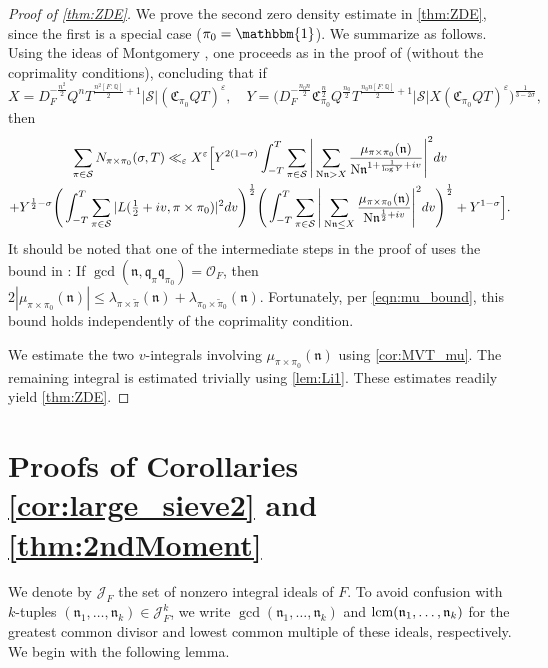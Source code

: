 \documentclass[11pt]{amsart}
\theoremstyle{remark}
\numberwithin{equation}{section}
\newcommand{\kn}{\mathfrak{n}}
\newcommand{\kq}{\mathfrak{q}}
\newcommand{\N}{\textnormal{N}}
\newcommand{\Q}{\mathbb{Q}}
\newcommand{\mJ}{\mathcal{J}}
\renewcommand{\tilde}{\widetilde}
\newcommand{\lcm}{\textnormal{lcm}}
\renewcommand{\epsilon}{\varepsilon}
\begin{document}
\begin{proof}[Proof of \cref{thm:ZDE}]
We prove the second zero density estimate in \cref{thm:ZDE}, since the first is a special case ($\pi_0=\mathbbm{1}$).  We summarize as follows.  Using the ideas of Montgomery \cite{Monty}, one proceeds as in the proof of \cite[Theorem 1.1]{humphries2024zeros} (without the coprimality conditions), concluding that if
\[
X=D_F^{-\frac{n^2}{2}}Q^n T^{\frac{n^2[F:\Q]}{2}+1}|\mathcal{S}|(\mathfrak{C}_{\pi_0}QT)^{\epsilon},\quad Y=\Big(D_F^{-\frac{n_0 n}{2}}\mathfrak{C}_{\pi_0}^{\frac{n}{2}}Q^{\frac{n_0}{2}}T^{\frac{n_0 n [F:\Q]}{2}+1}|\mathcal{S}|X(\mathfrak{C}_{\pi_0}QT)^{\epsilon}\Big)^{\frac{1}{3-2\sigma}},
\]
then 
\begin{multline*}
\sum_{\pi\in\mathcal{S}}N_{\pi\times\pi_0}(\sigma,T)\ll_{\epsilon} X^{\epsilon} \Big[Y^{2(1-\sigma)}\int_{-T}^{T}\sum_{\pi\in\mathcal{S}}\Bigg|\sum_{\N\kn>X}\frac{\mu_{\pi\times\pi_0}(\kn)}{\N\kn^{1+\frac{1}{\log Y}+iv}}\Bigg|^2 dv\\
+ Y^{\frac{1}{2}-\sigma}\Bigg(\int_{-T}^{T}\sum_{\pi\in\mathcal{S}}|L(\tfrac{1}{2}+iv,\pi\times\pi_0)|^2 dv\Bigg)^{\frac{1}{2}}\Bigg(\int_{-T}^{T}\sum_{\pi\in\mathcal{S}}\Bigg|\sum_{\N\kn\leq X}\frac{\mu_{\pi\times\pi_0}(\kn)}{\N\kn^{\frac{1}{2}+iv}}\Bigg|^2 dv\Bigg)^{\frac{1}{2}}+ Y^{1-\sigma}\Big].
\end{multline*}
It should be noted that one of the intermediate steps in the proof of \cite[Theorem 1.1]{humphries2024zeros} uses the bound in \cite[Lemma 3.3]{humphries2024zeros}:  If $\gcd(\kn,\kq_{\pi}\kq_{\pi_0})=\mathcal{O}_F$, then $2|\mu_{\pi\times\pi_0}(\kn)|\leq \lambda_{\pi\times\tilde{\pi}}(\kn)+\lambda_{\pi_0\times\tilde{\pi}_0}(\kn)$.  Fortunately, per \eqref{eqn:mu_bound}, this bound holds independently of the coprimality condition.

We estimate the two $v$-integrals involving $\mu_{\pi\times\pi_0}(\kn)$ using \cref{cor:MVT_mu}.  The remaining integral is estimated trivially using \cref{lem:Li1}.  These estimates readily yield \cref{thm:ZDE}.
\end{proof}




\section{Proofs of Corollaries \ref{cor:large_sieve2} and \ref{thm:2ndMoment}}
\label{sec:holder}

We denote by $\mJ_F$ the set of nonzero integral ideals of $F$. To avoid confusion with $k$-tuples $(\kn_1, \ldots, \kn_k) \in \mJ_F^k$, we write $\gcd(\kn_1, \ldots, \kn_k)$ and $\lcm(\kn_1, \ldots, \kn_k)$ for the greatest common divisor and lowest common multiple of these ideals, respectively. We begin with the following lemma.
\end{document}
